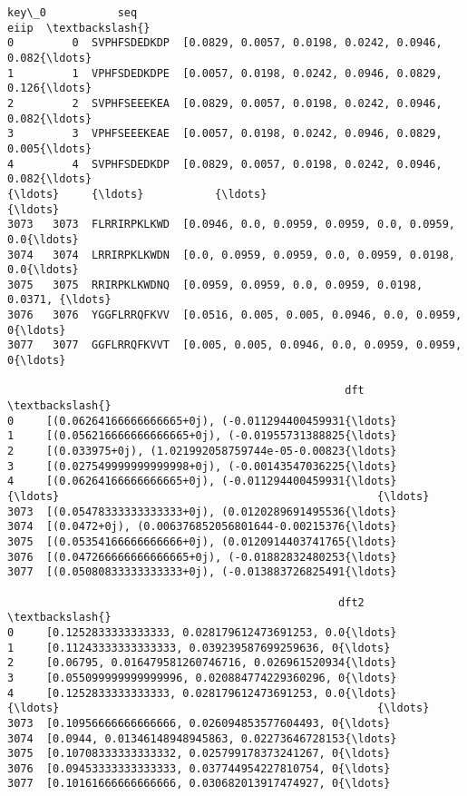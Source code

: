\documentclass[11pt]{article}
\makeatletter
\newcommand{\boxspacing}{\kern\kvtcb@left@rule\kern\kvtcb@boxsep}
\newcommand{\prompt}[4]{
        \ttfamily\llap{{\color{#2}[#3]:\hspace{3pt}#4}}\vspace{-\baselineskip}
    }
\makeatother
\begin{document}
            \begin{tcolorbox}[breakable, size=fbox, boxrule=.5pt, pad at break*=1mm, opacityfill=0]
\prompt{Out}{outcolor}{205}{\boxspacing}
\begin{Verbatim}[commandchars=\\\{\}]
      key\_0           seq                                               eiip  \textbackslash{}
0         0  SVPHFSDEDKDP  [0.0829, 0.0057, 0.0198, 0.0242, 0.0946, 0.082{\ldots}
1         1  VPHFSDEDKDPE  [0.0057, 0.0198, 0.0242, 0.0946, 0.0829, 0.126{\ldots}
2         2  SVPHFSEEEKEA  [0.0829, 0.0057, 0.0198, 0.0242, 0.0946, 0.082{\ldots}
3         3  VPHFSEEEKEAE  [0.0057, 0.0198, 0.0242, 0.0946, 0.0829, 0.005{\ldots}
4         4  SVPHFSDEDKDP  [0.0829, 0.0057, 0.0198, 0.0242, 0.0946, 0.082{\ldots}
{\ldots}     {\ldots}           {\ldots}                                                {\ldots}
3073   3073  FLRRIRPKLKWD  [0.0946, 0.0, 0.0959, 0.0959, 0.0, 0.0959, 0.0{\ldots}
3074   3074  LRRIRPKLKWDN  [0.0, 0.0959, 0.0959, 0.0, 0.0959, 0.0198, 0.0{\ldots}
3075   3075  RRIRPKLKWDNQ  [0.0959, 0.0959, 0.0, 0.0959, 0.0198, 0.0371, {\ldots}
3076   3076  YGGFLRRQFKVV  [0.0516, 0.005, 0.005, 0.0946, 0.0, 0.0959, 0{\ldots}
3077   3077  GGFLRRQFKVVT  [0.005, 0.005, 0.0946, 0.0, 0.0959, 0.0959, 0{\ldots}

                                                    dft  \textbackslash{}
0     [(0.06264166666666665+0j), (-0.011294400459931{\ldots}
1     [(0.056216666666666665+0j), (-0.01955731388825{\ldots}
2     [(0.033975+0j), (1.021992058759744e-05-0.00823{\ldots}
3     [(0.027549999999999998+0j), (-0.00143547036225{\ldots}
4     [(0.06264166666666665+0j), (-0.011294400459931{\ldots}
{\ldots}                                                 {\ldots}
3073  [(0.05478333333333333+0j), (0.0120289691495536{\ldots}
3074  [(0.0472+0j), (0.006376852056801644-0.00215376{\ldots}
3075  [(0.05354166666666666+0j), (0.0120914403741765{\ldots}
3076  [(0.047266666666666665+0j), (-0.01882832480253{\ldots}
3077  [(0.05080833333333333+0j), (-0.013883726825491{\ldots}

                                                   dft2  \textbackslash{}
0     [0.1252833333333333, 0.028179612473691253, 0.0{\ldots}
1     [0.11243333333333333, 0.039239587699259636, 0{\ldots}
2     [0.06795, 0.016479581260746716, 0.026961520934{\ldots}
3     [0.055099999999999996, 0.020884774229360296, 0{\ldots}
4     [0.1252833333333333, 0.028179612473691253, 0.0{\ldots}
{\ldots}                                                 {\ldots}
3073  [0.10956666666666666, 0.026094853577604493, 0{\ldots}
3074  [0.0944, 0.01346148948945863, 0.02273646728153{\ldots}
3075  [0.10708333333333332, 0.025799178373241267, 0{\ldots}
3076  [0.09453333333333333, 0.037744954227810754, 0{\ldots}
3077  [0.10161666666666666, 0.030682013917474927, 0{\ldots}


\end{Verbatim}
\end{tcolorbox}
\end{document}
